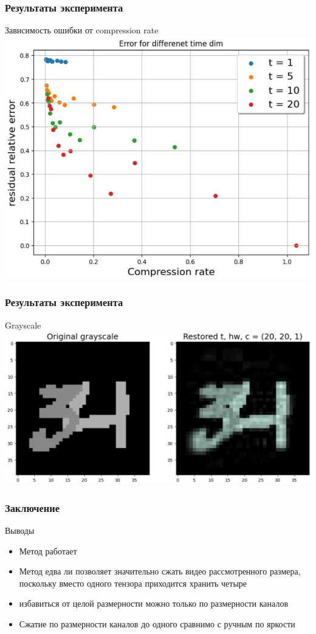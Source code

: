 \documentclass[10pt]{beamer}
\begin{document}
\begin{frame}
	\frametitle{Результаты эксперимента}
	\begin{block}{Зависимость ошибки от compression rate}
		\centering
		\includegraphics[scale=0.45]{./time.png}
	\end{block}		
\end{frame}

\begin{frame}
	\frametitle{Результаты эксперимента}
	\begin{block}{Grayscale}
		\centering
		\includegraphics[scale=0.45]{./grayscale.png}
	\end{block}		
\end{frame}

\begin{frame}
	\frametitle{Заключение}
	\begin{block}{Выводы}
		\begin{itemize}
		\item Метод работает
		\item Метод едва ли позволяет значительно сжать видео рассмотренного размера, поскольку вместо одного тензора приходится хранить четыре
		\item избавиться от целой размерности можно только по размерности каналов
		\item Сжатие по размерности каналов до одного сравнимо с ручным по яркости
		\end{itemize}
	\end{block}		
\end{frame}
\end{document}
